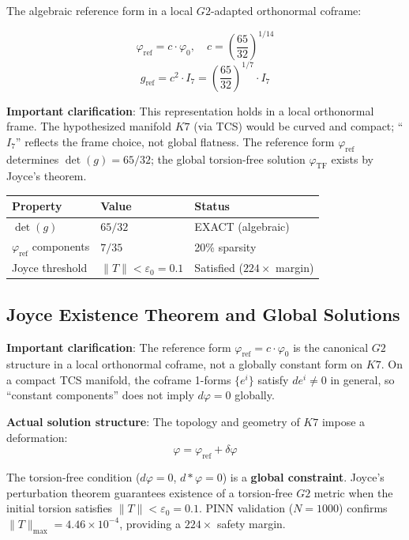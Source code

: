 \documentclass[11pt,a4paper]{article}
\newcommand{\Gtwo}{\mathrm{G}_2}
\newcommand{\Kseven}{K_7}
\def\Gtwo{G2}%
\def\Kseven{K7}%
\begin{document}
The algebraic reference form in a local $\Gtwo$-adapted orthonormal coframe:

$$\varphi_{\text{ref}} = c \cdot \varphi_0, \quad c = \left(\frac{65}{32}\right)^{1/14}$$
$$g_{\text{ref}} = c^2 \cdot I_7 = \left(\frac{65}{32}\right)^{1/7} \cdot I_7$$

\textbf{Important clarification}: This representation holds in a local orthonormal frame. The hypothesized manifold $\Kseven$ (via TCS) would be curved and compact; ``$I_7$'' reflects the frame choice, not global flatness. The reference form $\varphi_{\text{ref}}$ determines $\det(g) = 65/32$; the global torsion-free solution $\varphi_{\text{TF}}$ exists by Joyce's theorem.

\begin{table}[H]
\centering
\begin{tabular}{lll}
\toprule
Property & Value & Status \\
\midrule
$\det(g)$ & $65/32$ & EXACT (algebraic) \\
$\varphi_{\text{ref}}$ components & $7/35$ & 20\% sparsity \\
Joyce threshold & $\|T\| < \varepsilon_0 = 0.1$ & Satisfied ($224\times$ margin) \\
\bottomrule
\end{tabular}
\end{table}

\subsection{Joyce Existence Theorem and Global Solutions}

\textbf{Important clarification}: The reference form $\varphi_{\text{ref}} = c\cdot\varphi_0$ is the canonical $\Gtwo$ structure in a local orthonormal coframe, not a globally constant form on $\Kseven$. On a compact TCS manifold, the coframe 1-forms $\{e^i\}$ satisfy $de^i \neq 0$ in general, so ``constant components'' does not imply $d\varphi = 0$ globally.

\textbf{Actual solution structure}: The topology and geometry of $\Kseven$ impose a deformation:
$$\varphi = \varphi_{\text{ref}} + \delta\varphi$$

The torsion-free condition ($d\varphi = 0$, $d*\varphi = 0$) is a \textbf{global constraint}. Joyce's perturbation theorem guarantees existence of a torsion-free $\Gtwo$ metric when the initial torsion satisfies $\|T\| < \varepsilon_0 = 0.1$. PINN validation ($N=1000$) confirms $\|T\|_{\max} = 4.46 \times 10^{-4}$, providing a $224\times$ safety margin.
\end{document}
